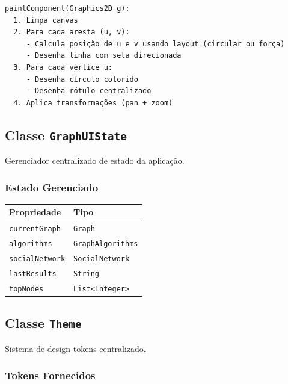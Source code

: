 \documentclass[12pt,a4paper]{article}
\begin{document}
    \begin{verbatim}
paintComponent(Graphics2D g):
  1. Limpa canvas
  2. Para cada aresta (u, v):
     - Calcula posição de u e v usando layout (circular ou força)
     - Desenha linha com seta direcionada
  3. Para cada vértice u:
     - Desenha círculo colorido
     - Desenha rótulo centralizado
  4. Aplica transformações (pan + zoom)
    \end{verbatim}

    \subsection{Classe \texttt{GraphUIState}}

    Gerenciador centralizado de estado da aplicação.

    \subsubsection{Estado Gerenciado}

    \begin{table}[h]
        \centering
        \begin{tabular}{|l|l|}
            \hline
            \textbf{Propriedade} & \textbf{Tipo} \\
            \hline
            \texttt{currentGraph} & \texttt{Graph} \\
            \hline
            \texttt{algorithms} & \texttt{GraphAlgorithms} \\
            \hline
            \texttt{socialNetwork} & \texttt{SocialNetwork} \\
            \hline
            \texttt{lastResults} & \texttt{String} \\
            \hline
            \texttt{topNodes} & \texttt{List<Integer>} \\
            \hline
        \end{tabular}
    \end{table}

    \subsection{Classe \texttt{Theme}}

    Sistema de design tokens centralizado.

    \subsubsection{Tokens Fornecidos}
\end{document}
